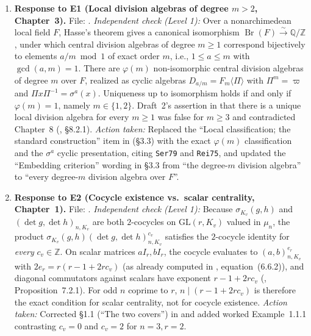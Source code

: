 \documentclass[12pt,letterpaper]{amsart}
\begin{document}
\begin{enumerate}[leftmargin=*,label=\textbf{R\arabic*.}]
\item \textbf{Response to E1 (Local division algebras of degree $m>2$, Chapter~3).} File: .
\emph{Independent check (Level 1):} Over a nonarchimedean local field $F$, Hasse's theorem gives a canonical isomorphism $\operatorname{Br}(F)\xrightarrow{\sim}\mathbb Q/\mathbb Z$, under which central division algebras of degree $m\ge 1$ correspond bijectively to elements $a/m\bmod 1$ of exact order $m$, i.e., $1\le a\le m$ with $\gcd(a,m)=1$. There are $\varphi(m)$ non-isomorphic central division algebras of degree $m$ over $F$, realized as cyclic algebras $D_{a/m}=F_m\langle\Pi\rangle$ with $\Pi^m=\varpi$ and $\Pi x\Pi^{-1}=\sigma^a(x)$. Uniqueness up to isomorphism holds if and only if $\varphi(m)=1$, namely $m\in\{1,2\}$. Draft~2's assertion in  that there is a unique local division algebra for every $m\ge 1$ was false for $m\ge 3$ and contradicted Chapter~8 (, \S8.2.1).
\emph{Action taken:} Replaced the ``Local classification; the standard construction'' item in  (\S3.3) with the exact $\varphi(m)$ classification and the $\sigma^a$ cyclic presentation, citing \texttt{Ser79} and \texttt{Rei75}, and updated the ``Embedding criterion'' wording in \S3.3 from ``the degree-$m$ division algebra'' to ``every degree-$m$ division algebra over $F$''.

\item \textbf{Response to E2 (Cocycle existence vs.\ scalar centrality, Chapter~1).} File: .
\emph{Independent check (Level 1):} Because $\sigma_{K_v}(g,h)$ and $(\det g,\det h)_{n,K_v}$ are both $2$-cocycles on $\mathrm{GL}(r,K_v)$ valued in $\mu_n$, the product $\sigma_{K_v}(g,h)(\det g,\det h)_{n,K_v}^{c_v}$ satisfies the $2$-cocycle identity for \emph{every} $c_v\in\mathbb Z$. On scalar matrices $aI_r,bI_r$, the cocycle evaluates to $(a,b)_{n,K_v}^{e_r}$ with $2e_r = r(r-1+2rc_v)$ (as already computed in , equation~(6.6.2)), and diagonal commutators against scalars have exponent $r-1+2rc_v$ (, Proposition~7.2.1). For odd $n$ coprime to $r$, $n\mid (r-1+2rc_v)$ is therefore the exact condition for scalar centrality, not for cocycle existence.
\emph{Action taken:} Corrected \S1.1 (``The two covers'') in  and added worked Example~1.1.1 contrasting $c_v=0$ and $c_v=2$ for $n=3,r=2$.


\end{enumerate}
\end{document}
